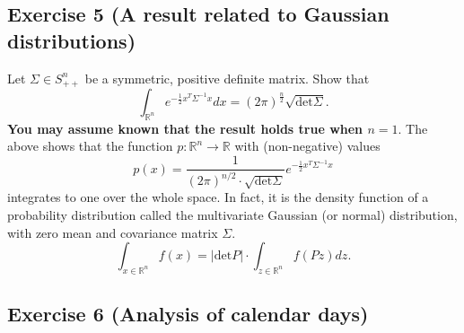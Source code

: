\documentclass[11pt]{article}
\begin{document}
\begin{solution}
\end{solution}

\newpage
\subsection*{Exercise 5 (A result related to Gaussian distributions)}

Let $\Sigma \in S^n_{++}$ be a symmetric, positive definite matrix. Show that
$$
\int_{\mathbb{R}^n} e^{-\frac{1}{2}x^T \Sigma^{-1} x} dx
= (2 \pi)^{\frac{n}{2}} \sqrt{\text{det} \Sigma}.
$$
\textbf{You may assume known that the result holds true when $n = 1$}. The above shows that the function $p : \mathbb{R}^n \rightarrow \mathbb{R}$ with (non-negative) values
$$
p(x) = \frac{1}{(2\pi)^{n/2} \cdot \sqrt{\text{det} \Sigma}} e^{-\frac{1}{2} x^T \Sigma^{-1} x}
$$
integrates to one over the whole space. In fact, it is the density function of a probability distribution called the multivariate Gaussian (or normal) distribution, with zero mean and covariance matrix $\Sigma$.
$$
\int_{x \in \mathbb{R}^n} f(x)
=
|\text{det} P| \cdot \int_{z \in \mathbb{R}^n} f(Pz) dz.
$$

\begin{solution}
\end{solution}

\newpage
\subsection*{Exercise 6 (Analysis of calendar days)}
\end{document}
